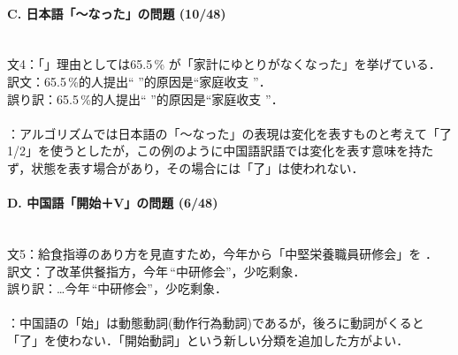 \paragraph{C. 日本語「〜なった」の問題 (10/48)}　\\
文4：「」理由としては65.5\,\% が「家計にゆとりがなくなった」を挙げている．\\
訳文：65.5\,\%的人提出``  ''的原因是``家庭收支 ''．\\
誤り訳：65.5\,\%的人提出``  ''的原因是``家庭收支 ''．\\
\\
：アルゴリズムでは日本語の「〜なった」の表現は変化を表すものと考えて「了1/2」を使うとしたが，この例のように中国語訳語では変化を表す意味を持たず，状態を表す場合があり，その場合には「了」は使われない．

\paragraph{D. 中国語「開始＋V」の問題 (6/48)}　\\
文5：給食指導のあり方を見直すため，今年から「中堅栄養職員研修会」を ．\\
訳文：了改革供餐指方，今年\,``中研修会''，少吃剩象．\\
誤り訳：…今年\,``中研修会''，少吃剩象．\\
\\
：中国語の「始」は動態動詞(動作行為動詞)であるが，後ろに動詞がくると「了」を使わない．「開始動詞」という新しい分類を追加した方がよい．

